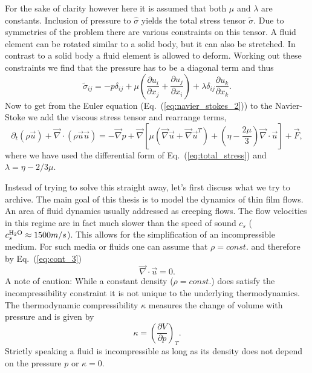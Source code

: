 For the sake of clarity however here it is assumed that both $\mu$ and $\lambda$ are constants.
Inclusion of pressure to $\hat{\sigma}$ yields the total stress tensor $\tilde{\sigma}$. 
Due to symmetries of the problem there are various constraints on this tensor.
A fluid element can be rotated similar to a solid body, but it can also be stretched. 
In contrast to a solid body a fluid element is allowed to deform.
Working out these constraints we find that the pressure has to be a diagonal term and thus
\begin{equation}\label{eq:total_stress}
    \tilde{\sigma}_{ij} = - p \delta_{ij} + \mu\left(\frac{\partial u_i}{\partial x_j} + \frac{\partial u_j}{\partial x_i}\right) + \lambda\delta_{ij}\frac{\partial u_k}{\partial x_k}.
\end{equation}
Now to get from the Euler equation (Eq.~(\ref{eq:navier_stokes_2})) to the Navier-Stoke we add the viscous stress tensor and rearrange terms,
\begin{equation}\label{eq:navier_stokes_3}
    \partial_t(\rho\vec{u}) + \vec{\nabla}\cdot(\rho\vec{u}\vec{u}) = - \vec{\nabla} p + \vec{\nabla}\left[\mu(\vec{\nabla}\vec{u} + \vec{\nabla}\vec{u}^T) + \left(\eta-\frac{2\mu}{3}\right)\vec{\nabla}\cdot\vec{u}\right] + \vec{F},
\end{equation}
where we have used the differential form of Eq.~(\ref{eq:total_stress}) and $\lambda = \eta - 2/3\mu$.

Instead of trying to solve this straight away, let's first discuss what we try to archive.
The main goal of this thesis is to model the dynamics of thin film flows.
An area of fluid dynamics usually addressed as creeping flows. 
The flow velocities in this regime are in fact much slower than the speed of sound $c_s$ ($c_s^{\ce{H2O}} \approx 1500m/s $). 
This allows for the simplification of an incompressible medium.
For such media or fluids one can assume that $\rho = const.$ and therefore by Eq.~(\ref{eq:cont_3}) 
\begin{equation}\label{eq:incomp}
    \vec{\nabla}\cdot\vec{u} = 0.
\end{equation}
A note of caution: While a constant density ($\rho = const.$) does satisfy the incompressibility constraint it is not unique to the underlying thermodynamics.
The thermodynamic compressibility $\kappa$ measures the change of volume with pressure and is given by 
\begin{equation}
    \kappa = \left(\frac{\partial V}{\partial p}\right)_T.
\end{equation}
Strictly speaking a fluid is incompressible as long as its density does not depend on the pressure $p$ or $\kappa = 0$.

